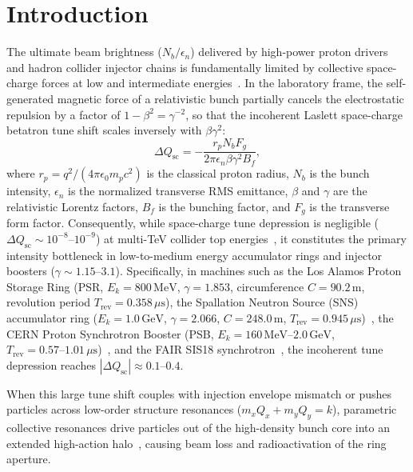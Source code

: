 \documentclass[11pt,a4paper]{article}
\begin{document}
\section{Introduction}
The ultimate beam brightness ($N_b / \epsilon_n$) delivered by high-power proton drivers and hadron collider injector chains is fundamentally limited by collective space-charge forces at low and intermediate energies~\cite{reiser2008theory,baartman1998space}. In the laboratory frame, the self-generated magnetic force of a relativistic bunch partially cancels the electrostatic repulsion by a factor of $1 - \beta^2 = \gamma^{-2}$, so that the incoherent Laslett space-charge betatron tune shift scales inversely with $\beta \gamma^2$:
\begin{equation}
    \Delta Q_{\mathrm{sc}} = - \frac{r_p N_b F_g}{2 \pi \epsilon_n \beta \gamma^2 B_f},
    \label{eq:tune_shift}
\end{equation}
where $r_p = q^2 / (4\pi \epsilon_0 m_p c^2)$ is the classical proton radius, $N_b$ is the bunch intensity, $\epsilon_n$ is the normalized transverse RMS emittance, $\beta$ and $\gamma$ are the relativistic Lorentz factors, $B_f$ is the bunching factor, and $F_g$ is the transverse form factor. Consequently, while space-charge tune depression is negligible ($\Delta Q_{\mathrm{sc}} \sim 10^{-8}\text{--}10^{-9}$) at multi-TeV collider top energies~\cite{fcc2019conceptual}, it constitutes the primary intensity bottleneck in low-to-medium energy accumulator rings and injector boosters ($\gamma \sim 1.15\text{--}3.1$). Specifically, in machines such as the Los Alamos Proton Storage Ring (PSR, $E_k = 800\,\mathrm{MeV}$, $\gamma = 1.853$, circumference $C = 90.2\,\mathrm{m}$, revolution period $T_{\mathrm{rev}} = 0.358\,\mu\mathrm{s}$), the Spallation Neutron Source (SNS) accumulator ring ($E_k = 1.0\,\mathrm{GeV}$, $\gamma = 2.066$, $C = 248.0\,\mathrm{m}$, $T_{\mathrm{rev}} = 0.945\,\mu\mathrm{s}$)~\cite{henderson2014spallation}, the CERN Proton Synchrotron Booster (PSB, $E_k = 160\,\mathrm{MeV}\text{--}2.0\,\mathrm{GeV}$, $T_{\mathrm{rev}} = 0.57\text{--}1.01\,\mu\mathrm{s}$)~\cite{benedetto2015space}, and the FAIR SIS18 synchrotron~\cite{fair2006accelerator}, the incoherent tune depression reaches $|\Delta Q_{\mathrm{sc}}| \approx 0.1\text{--}0.4$.

When this large tune shift couples with injection envelope mismatch or pushes particles across low-order structure resonances ($m_x Q_x + m_y Q_y = k$), parametric collective resonances drive particles out of the high-density bunch core into an extended high-action halo~\cite{fedotov2003space}, causing beam loss and radioactivation of the ring aperture.
\end{document}
